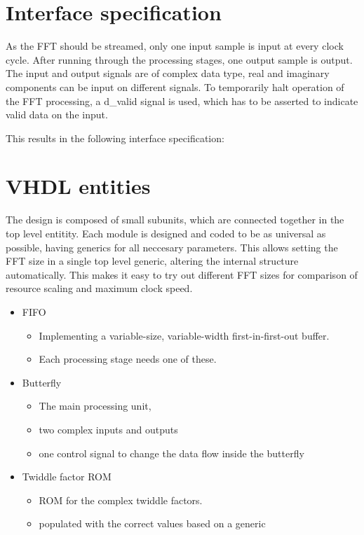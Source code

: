 \chapter{Interface specification}
As the FFT should be streamed, only one input sample is input at every clock cycle. After running through the processing stages, one output sample is output. The input and output signals are of complex data type, real and imaginary components can be input on different signals. To temporarily halt operation of the FFT processing, a d\_valid signal is used, which has to be asserted to indicate valid data on the input.

This results in the following interface specification:


\chapter{VHDL entities}
The design is composed of small subunits, which are connected together in the top level entitity. Each module is designed and coded to be as universal as possible, having generics for all neccesary parameters. This allows setting the FFT size in a single top level generic, altering the internal structure automatically.
This makes it easy to try out different FFT sizes for comparison of resource scaling and maximum clock speed.

\begin{itemize}
	\item FIFO
	\begin{itemize}
		\item Implementing a variable-size, variable-width first-in-first-out buffer. 		\item Each processing stage needs one of these.
	\end{itemize}
	\item Butterfly
	\begin{itemize}
		\item The main processing unit, 
		\item two complex inputs and outputs
		\item one control signal to change the data flow inside the butterfly
	\end{itemize}
	\item Twiddle factor ROM
	\begin{itemize}
		\item ROM for the complex twiddle factors.
		\item populated with the correct values based on a generic 
	\end{itemize}
\end{itemize}


